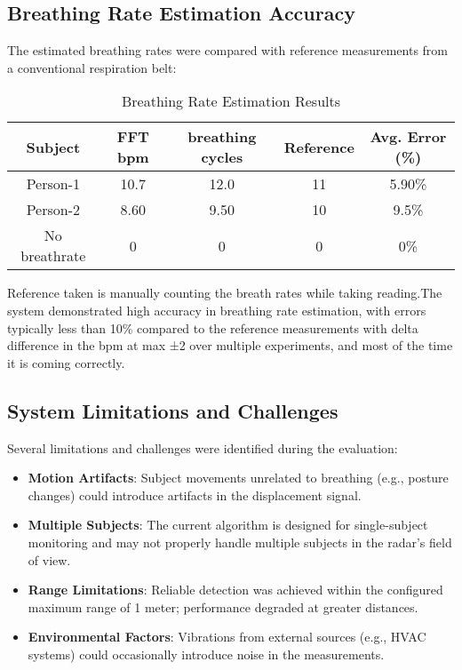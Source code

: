\documentclass[12pt]{article}
\begin{document}
\subsection{Breathing Rate Estimation Accuracy}
The estimated breathing rates were compared with reference measurements from a conventional respiration belt:

\begin{table}[H]
\centering
\begin{tabular}{|c|c|c|c|c|}
\hline
\textbf{Subject} & \textbf{FFT bpm} & \textbf{breathing cycles} & \textbf{Reference} & \textbf{Avg. Error (\%)} \\
\hline
Person-1 & 10.7 & 12.0 & 11 & 5.90\% \\
Person-2 & 8.60 & 9.50 & 10 & 9.5\% \\
No breathrate & 0 & 0 & 0 & 0\% \\
\hline
\end{tabular}
\caption{Breathing Rate Estimation Results}
\end{table}

Reference taken is manually counting the breath rates while taking reading.The system demonstrated high accuracy in breathing rate estimation, with errors typically less than 10\% compared to the reference measurements with delta difference in the bpm at max ±2 over multiple experiments, and most of the time it is coming correctly.

\subsection*{System Limitations and Challenges}
Several limitations and challenges were identified during the evaluation:

\begin{itemize}
    \item \textbf{Motion Artifacts}: Subject movements unrelated to breathing (e.g., posture changes) could introduce artifacts in the displacement signal.
    
    \item \textbf{Multiple Subjects}: The current algorithm is designed for single-subject monitoring and may not properly handle multiple subjects in the radar's field of view.
    
    \item \textbf{Range Limitations}: Reliable detection was achieved within the configured maximum range of 1 meter; performance degraded at greater distances.
    
    \item \textbf{Environmental Factors}: Vibrations from external sources (e.g., HVAC systems) could occasionally introduce noise in the measurements.
\end{itemize}
\end{document}
